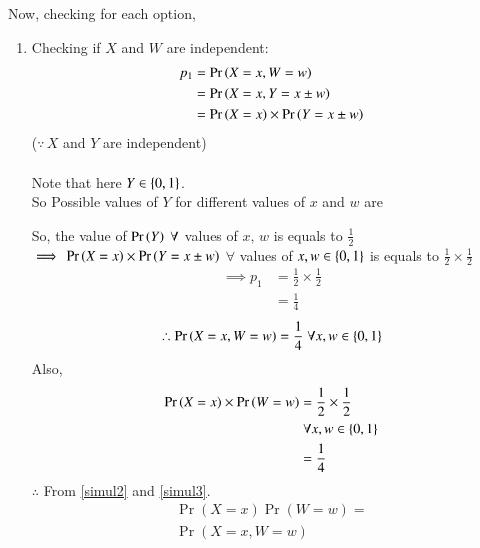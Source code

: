 \documentclass[journal,12pt,twocolumn]{IEEEtran}
\begin{document}
Now, checking for each option,
\begin{enumerate}
    \item Checking if $X$ and $W$ are independent:
\begin{align}
    p_1 &= \Pr\left(X=x,W=w\right)\\
        &= \Pr\left(X=x,Y=x\pm w\right)\\
        &=\Pr\left(X=x\right)\times\Pr\left(Y=x\pm w\right)
\end{align}
($\because\,X$ and $Y$ are independent)\\\\ 
Note that here $Y \in \left\{0,1\right\}$.\\
So Possible values of $Y$ for different values of $x$ and $w$ are
\begin{center}
\begin{table}[h]
    \centering
    \caption{\large Probability Table for $Y$ when different $x$ and $w$'s are substituted}
    \label{Table 2}
\end{table}
\end{center}
So, the value of $\Pr\left(Y\right)\;\forall$ values of $x,\,w$ is equals to $\frac{1}{2}$\\ 
$\implies\,\Pr\left(X=x\right)\times\Pr\left(Y=x\pm w\right)$ $\forall$ values of $x,w\in \left\{0,1\right\}$ is equals to $\frac{1}{2}\times\frac{1}{2}$
\begin{align}
\implies p_1 &= \frac{1}{2}\times\frac{1}{2}\\
             &= \frac{1}{4}
\end{align}
\begin{align}
   \therefore \Pr\left(X=x,W=w\right) = \frac{1}{4}\;\forall x,w\in \left\{0,1\right\} \label{simul2}
\end{align}
Also,
\begin{align}
\nonumber\Pr\left(X=x\right)\times\Pr\left(W=w\right) &= \frac{1}{2} \times\frac{1}{2}\\
                                &\;\forall x,w\in \left\{0,1\right\}  \\ 
                                &= \frac{1}{4} \label{simul3}
\end{align}
$\therefore$ From \eqref{simul2} and \eqref{simul3}.
\begin{multline}
    \Pr{(X=x)}\Pr{(W=w)} =\\ \Pr{(X=x,W=w)}
\end{multline}


\end{enumerate}
\end{document}
